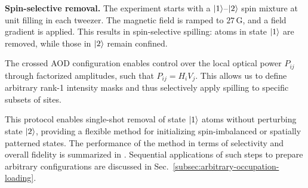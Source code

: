 \textbf{Spin-selective removal.}
The experiment starts with a $\left| 1 \right\rangle$–$\left| 2 \right\rangle$ spin mixture at unit filling in each tweezer. The magnetic field is ramped to $27\,\mathrm{G}$, and a field gradient is applied. This results in spin-selective spilling: atoms in state $\left| 1 \right\rangle$ are removed, while those in $\left| 2 \right\rangle$ remain confined.

The crossed AOD configuration enables control over the local optical power $P_{ij}$ through factorized amplitudes, such that $P_{ij} = H_i V_j$. This allows us to define arbitrary rank-1 intensity masks and thus selectively apply spilling to specific subsets of sites. 

This protocol enables single-shot removal of state $\left| 1 \right\rangle$ atoms without perturbing state $\left| 2 \right\rangle$, providing a flexible method for initializing spin-imbalanced or spatially patterned states. The performance of the method in terms of selectivity and overall fidelity is summarized in . Sequential applications of such steps to prepare arbitrary configurations are discussed in Sec.~\ref{subsec:arbitrary-occupation-loading}.
